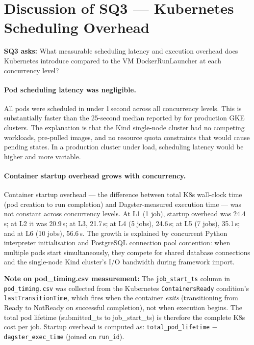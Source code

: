 
\section{Discussion of SQ3 --- Kubernetes Scheduling Overhead}
\label{sec:discuss-sq3}

\textbf{SQ3 asks:} What measurable scheduling latency and execution overhead does Kubernetes introduce compared to the VM DockerRunLauncher at each concurrency level?

\paragraph{Pod scheduling latency was negligible.}
All pods were scheduled in under 1\,second across all concurrency levels.
This is substantially faster than the 25-second median reported by \citet{choi2021} for production GKE clusters.
The explanation is that the Kind single-node cluster had no competing workloads, pre-pulled images, and no resource quota constraints that would cause pending states.
In a production cluster under load, scheduling latency would be higher and more variable.

\paragraph{Container startup overhead grows with concurrency.}
Container startup overhead --- the difference between total K8s wall-clock time (pod creation to run completion) and Dagster-measured execution time --- was not constant across concurrency levels.
At L1 (1 job), startup overhead was 24.4\,s; at L2 it was 20.9\,s; at L3, 21.7\,s; at L4 (5 jobs), 24.6\,s; at L5 (7 jobs), 35.1\,s; and at L6 (10 jobs), 56.6\,s.
The growth is explained by concurrent Python interpreter initialisation and PostgreSQL connection pool contention: when multiple pods start simultaneously, they compete for shared database connections and the single-node Kind cluster's I/O bandwidth during framework import.

\textbf{Note on pod\_timing.csv measurement:} The \texttt{job\_start\_ts} column in \texttt{pod\_timing.csv} was collected from the Kubernetes \texttt{ContainersReady} condition's \texttt{lastTransitionTime}, which fires when the container \emph{exits} (transitioning from Ready to NotReady on successful completion), not when execution begins.
The total pod lifetime (submitted\_ts to job\_start\_ts) is therefore the complete K8s cost per job.
Startup overhead is computed as: \texttt{total\_pod\_lifetime} $-$ \texttt{dagster\_exec\_time} (joined on \texttt{run\_id}).

